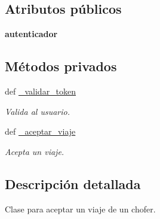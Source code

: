 \subsection*{Atributos públicos}
\begin{DoxyCompactItemize}
\item 
\hypertarget{classsrc_1_1resources_1_1aceptar_viaje_1_1_aceptar_viaje_affd7a9ee72935b1e44374caee1a5548d}{{\bfseries autenticador}}\label{classsrc_1_1resources_1_1aceptar_viaje_1_1_aceptar_viaje_affd7a9ee72935b1e44374caee1a5548d}

\end{DoxyCompactItemize}
\subsection*{Métodos privados}
\begin{DoxyCompactItemize}
\item 
def \hyperlink{classsrc_1_1resources_1_1aceptar_viaje_1_1_aceptar_viaje_a4bd84587a95e42ae2a42d7d4066a5d6e}{\-\_\-validar\-\_\-token}
\begin{DoxyCompactList}\small\item\em Valida al usuario. \end{DoxyCompactList}\item 
def \hyperlink{classsrc_1_1resources_1_1aceptar_viaje_1_1_aceptar_viaje_a2ad5306a2503932d0ae230665e6681a9}{\-\_\-aceptar\-\_\-viaje}
\begin{DoxyCompactList}\small\item\em Acepta un viaje. \end{DoxyCompactList}\end{DoxyCompactItemize}


\subsection{Descripción detallada}
Clase para aceptar un viaje de un chofer. 



